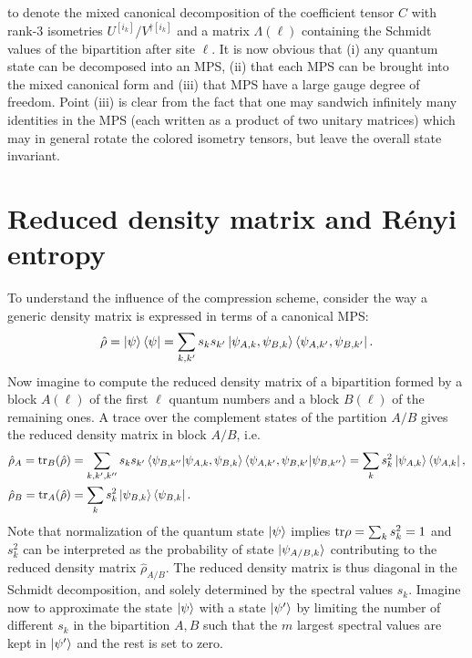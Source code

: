 to denote the mixed canonical decomposition of the coefficient tensor $C$ with rank-$3$ isometries ${U^{[i_k]}/V^{\dag[i_k]}}$ and a matrix $\Lambda(\ell)$ containing the Schmidt values of the bipartition after site $\ell$.
It is now obvious that (i) any quantum state can be decomposed into an MPS, (ii) that each MPS can be brought into the mixed canonical form and (iii) that MPS have a large gauge degree of freedom.
Point (iii) is clear from the fact that one may sandwich infinitely many identities in the MPS (each written as a product of two unitary matrices) which may in general rotate the colored isometry tensors, but leave the overall state invariant.
%
%
\section{Reduced density matrix and Rényi entropy}
\label{sec:reduced_density_matrix_and_renyi_entropy}
%
%
To understand the influence of the compression scheme, consider the way a generic density matrix is expressed in terms of a canonical MPS:
\begin{align}
    \hat\rho = \ket{\psi}\bra{\psi} = \sum_{k,k'}s_ks_{k'}\ket{\psi_{A,k},\psi_{B,k}}\bra{\psi_{A,k'},\psi_{B,k'}}.
\end{align}
Now imagine to compute the reduced density matrix of a bipartition formed by a block $A(\ell)$ of the first $\ell$ quantum numbers and a block $B(\ell)$ of the remaining ones.
A trace over the complement states of the partition $A/B$ gives the reduced density matrix in block $A/B$, i.e.
\begin{align}
    \hat\rho_A = {\rm tr}_B(\hat\rho)
    &=
    \sum_{k,k',k''}
    s_ks_{k'}
    \braket{\psi_{B,k''}|\psi_{A,k},\psi_{B,k}}\braket{\psi_{A,k'},\psi_{B,k'}|\psi_{B,k''}}
    =
    \sum_k s_k^2 \ket{\psi_{A,k}}\bra{\psi_{A,k}},\nonumber\\
    \hat\rho_B = {\rm tr}_A(\hat\rho)
    &=
    \sum_k s_k^2 \ket{\psi_{B,k}}\bra{\psi_{B,k}}.
\end{align}
Note that normalization of the quantum state $\ket\psi$ implies ${\rm tr}\rho=\sum_k s_k^2=1$ and $s_k^2$ can be interpreted as the probability of state $\ket{\psi_{A/B,k}}$ contributing to the reduced density matrix $\hat\rho_{A/B}$.
The reduced density matrix is thus diagonal in the Schmidt decomposition, and solely determined by the spectral values $s_k$.
Imagine now to approximate the state $\ket\psi$ with a state $\ket{\psi'}$ by limiting the number of different $s_k$ in the bipartition $A,B$ such that the $m$ largest spectral values are kept in $\ket{\psi'}$ and the rest is set to zero.
